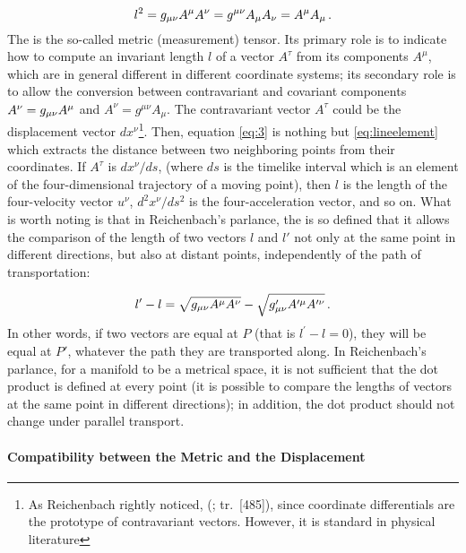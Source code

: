 \documentclass[final]{article}
\newcommand{\labtag}[1]{\label{#1}}
\newcommand{\til}{timelike\xspace}
\renewcommand{\rzlap}[2]{(\cite[#1]{Reichenbach1928}; tr.\ [#2])\xspace}
\begin{document}
 
\begin{equation}\labtag{eq:3}
l^2=\gmn A^\mu A^\nu = g^{\mu\nu} A_\mu A_\nu = A^\mu A_\mu\,.
\end{equation}
%
The \gmn is the so-called metric (\ie measurement) tensor. Its primary role is to indicate how to compute an invariant length $l$ of a vector $A^\tau$ from its components $A^\mu$, which are in general different in different coordinate systems; its secondary role is to allow the conversion between contravariant and covariant components $A^\nu = g_{\mu\nu} A^\mu$ and $A^\nu = g^{\mu \nu} A_\mu$. The contravariant vector $A^\tau$ could be the displacement vector $dx^\nu$\footnote{As Reichenbach rightly noticed,  \rzlap{348}{485\fn}, since coordinate differentials are the prototype of contravariant vectors. However, it is standard in physical literature}. Then, equation \cref{eq:3} is nothing but \cref{eq:lineelement} which extracts the distance between two neighboring points from their coordinates. If $A^\tau$ is $dx^\nu/ds$, (where $ds$ is the \til interval which is an element of the four-dimensional trajectory of a moving point), then $l$ is the length of the four-velocity vector $u^\nu$, $d^{2} x^{\nu} / d s^{2}$ is the four-acceleration vector, and so on. What is worth noting is that in Reichenbach's parlance, the  \gmn is so defined that it allows the comparison of the length of two vectors $l$ and $l'$ not only at the same point in different directions, but also at distant points, independently of the path of transportation:

\begin{equation*}
l^{\prime}-l=\sqrt{g_{\mu\nu} A^\mu A^\nu}-\sqrt{g_{\mu\nu}^{\prime} A^{\prime\mu} A^{\prime\nu}}\,.
\end{equation*}
%
In other words, if two vectors are equal at $P$ (that is $l^{\prime}-l=0$), they will be equal at $P'$, whatever the path they are transported along. In Reichenbach's parlance, for a manifold to be a metrical space, it is not sufficient that the dot product is defined at every point (\ie it is possible to compare the lengths of vectors at the same point in different directions); in addition, the dot product should not change under parallel transport.

\paragraph{Compatibility between the Metric and the Displacement}
\end{document}
